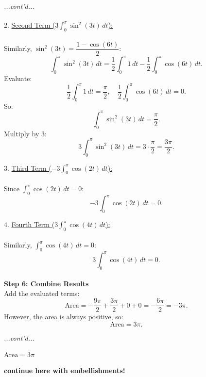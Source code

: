 \documentclass{article}
\begin{document}
\begin{exercisebox}
    \begin{solutionbox}
        \textit{...cont'd...} \\
        \\
        2. \underline{Second Term (\(3\int_{0}^{\pi} \sin^2(3t) \, dt\)):} \\
        \\
       Similarly, \( \sin^2(3t) = \dfrac{1 - \cos(6t)}{2} \):
       \[
           \int_{0}^{\pi} \sin^2(3t) \, dt = \frac{1}{2} \int_{0}^{\pi} 1 \, dt - \frac{1}{2} \int_{0}^{\pi} \cos(6t) \, dt.
       \]
       Evaluate:
       \[
           \frac{1}{2} \int_{0}^{\pi} 1 \, dt = \frac{\pi}{2}, \quad \frac{1}{2} \int_{0}^{\pi} \cos(6t) \, dt = 0.
       \]
       So:
       \[
           \int_{0}^{\pi} \sin^2(3t) \, dt = \frac{\pi}{2}.
       \]
       Multiply by 3:
       \[
           3\int_{0}^{\pi} \sin^2(3t) \, dt = 3 \cdot \frac{\pi}{2} = \frac{3\pi}{2}.
       \]

    3. \underline{Third Term (\(-3\int_{0}^{\pi} \cos(2t) \, dt\)):} \\
    \\
       Since \(\int_{0}^{\pi} \cos(2t) \, dt = 0\):
       \[
           -3\int_{0}^{\pi} \cos(2t) \, dt = 0.
       \]

    4. \underline{Fourth Term (\(3\int_{0}^{\pi} \cos(4t) \, dt\)):} \\
    \\
       Similarly, \(\int_{0}^{\pi} \cos(4t) \, dt = 0\):
       \[
           3\int_{0}^{\pi} \cos(4t) \, dt = 0.
       \]
    \\
    \textbf{Step 6: Combine Results} \\
    Add the evaluated terms:
    \[
        \text{Area} = -\frac{9\pi}{2} + \frac{3\pi}{2} + 0 + 0 = -\frac{6\pi}{2} = -3\pi.
    \]
    However, the area is always positive, so:
    \[
        \text{Area} = 3\pi.
    \]
    \end{solutionbox}
\end{exercisebox}
\begin{exercisebox}
    \begin{solutionbox}
        \textit{...cont'd...}
        \begin{answerbox}
            \( \text{Area} = 3\pi \)
        \end{answerbox}
    \end{solutionbox}
\end{exercisebox}

\textbf{continue here with embellishments!}
\end{document}
